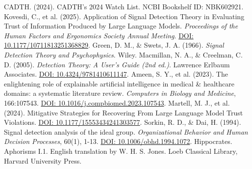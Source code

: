 \documentclass[11pt,a4paper]{article}
\begin{document}
\begin{thebibliography}{99}
 CADTH. (2024). CADTH's 2024 Watch List. NCBI Bookshelf ID: NBK602921.
 Kovesdi, C., et al. (2025). Application of Signal Detection Theory in Evaluating Trust of Information Produced by Large Language Models. \textit{Proceedings of the Human Factors and Ergonomics Society Annual Meeting}. \href{https://doi.org/10.1177/10711813251368829}{DOI: 10.1177/10711813251368829}.  
 Green, D. M., \& Swets, J. A. (1966). \textit{Signal Detection Theory and Psychophysics}. Wiley.  
 Macmillan, N. A., \& Creelman, C. D. (2005). \textit{Detection Theory: A User's Guide (2nd ed.)}. Lawrence Erlbaum Associates. \href{https://doi.org/10.4324/9781410611147}{DOI: 10.4324/9781410611147}.  
 Ameen, S. Y., et al. (2023). The enlightening role of explainable artificial intelligence in medical \& healthcare domains: a systematic literature review. \textit{Computers in Biology and Medicine}, 166:107543. \href{https://doi.org/10.1016/j.compbiomed.2023.107543}{DOI: 10.1016/j.compbiomed.2023.107543}.  
 Martell, M. J., et al. (2024). Mitigative Strategies for Recovering From Large Language Model Trust Violations. \href{https://doi.org/10.1177/15553434241303577}{DOI: 10.1177/15553434241303577}.  
 Sorkin, R. D., \& Dai, H. (1994). Signal detection analysis of the ideal group. \textit{Organizational Behavior and Human Decision Processes}, 60(1), 1-13. \href{https://doi.org/10.1006/obhd.1994.1072}{DOI: 10.1006/obhd.1994.1072}.
 Hippocrates. Aphorisms I.1. English translation by W. H. S. Jones. Loeb Classical Library, Harvard University Press.
\end{thebibliography}
\end{document}
